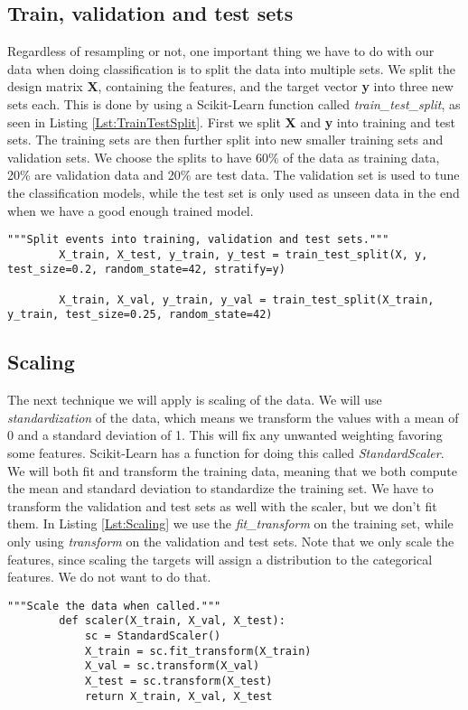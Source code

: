 \documentclass[a4paper, american, 12pt]{report}
\begin{document}
	\subsection{Train, validation and test sets}
	\label{subsect:Method-TrainTestSplit}
	Regardless of resampling or not, one important thing we have to do with our data when doing classification is to split the data into multiple sets. We split the design matrix \textbf{X}, containing the features, and the target vector \textbf{y} into three new sets each. This is done by using a Scikit-Learn function called \textit{train\_test\_split}, as seen in Listing \ref{Lst:TrainTestSplit}. First we split \textbf{X} and \textbf{y} into training and test sets. The training sets are then further split into new smaller training sets and validation sets. We choose the splits to have 60\% of the data as training data, 20\% are validation data and 20\% are test data. The validation set is used to tune the classification models, while the test set is only used as unseen data in the end when we have a good enough trained model.
	\begin{lstlisting}[caption=Splitting the data., label=Lst:TrainTestSplit]
		"""Split events into training, validation and test sets."""
		X_train, X_test, y_train, y_test = train_test_split(X, y, test_size=0.2, random_state=42, stratify=y)
		
		X_train, X_val, y_train, y_val = train_test_split(X_train, y_train, test_size=0.25, random_state=42)
	\end{lstlisting}


	\subsection{Scaling}
	\label{subsect:Method-Scaling}
	The next technique we will apply is scaling of the data. We will use \textit{standardization} of the data, which means we transform the values with a mean of 0 and a standard deviation of 1. This will fix any unwanted weighting favoring some features. Scikit-Learn has a function for doing this called \textit{StandardScaler}. We will both fit and transform the training data, meaning that we both compute the mean and standard deviation to standardize the training set. We have to transform the validation and test sets as well with the scaler, but we don't fit them. In Listing \ref{Lst:Scaling} we use the \textit{fit\_transform} on the training set, while only using \textit{transform} on the validation and test sets. Note that we only scale the features, since scaling the targets will assign a distribution to the categorical features. We do not want to do that.
	\begin{lstlisting}[caption=Function for scaling data., label=Lst:Scaling]
		"""Scale the data when called."""
		def scaler(X_train, X_val, X_test):
			sc = StandardScaler()
			X_train = sc.fit_transform(X_train)
			X_val = sc.transform(X_val)
			X_test = sc.transform(X_test)
			return X_train, X_val, X_test
	\end{lstlisting}
	
\end{document}
